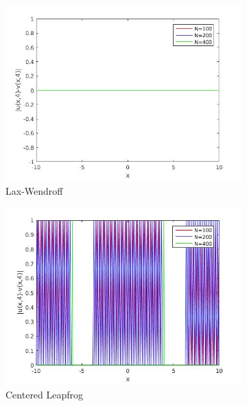 \begin{figure}[H]
\centering
\begin{subfigure}[b]{0.3\textwidth}
  \centering
  \includegraphics[width=\textwidth]{Images/5_lw_compare.jpg}
  \caption{Lax-Wendroff}
\end{subfigure}
\hfill
\begin{subfigure}[b]{0.3\textwidth}
  \includegraphics[width=\textwidth]{Images/5_cl_compare.jpg}
  \caption{Centered Leapfrog}
\end{subfigure}
\hfill
\begin{subfigure}[b]{0.3\textwidth}

\end{subfigure}
\end{figure}
